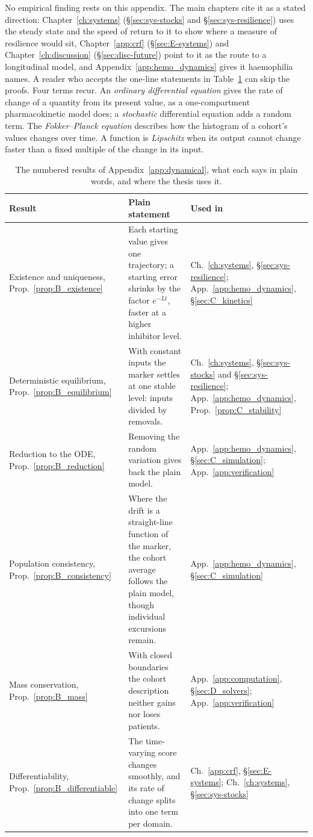 No empirical finding rests on this appendix. The main chapters cite it as a
stated direction: Chapter~\ref{ch:systems} (\S\ref{sec:sys-stocks} and
\S\ref{sec:sys-resilience}) uses the steady state and the speed of return to it
to show where a measure of resilience would sit, Chapter~\ref{app:crf}
(\S\ref{sec:E-systems}) and Chapter~\ref{ch:discussion}
(\S\ref{sec:disc-future}) point to it as the route to a longitudinal model, and
Appendix~\ref{app:hemo_dynamics} gives it haemophilia names. A reader who
accepts the one-line statements in Table~\ref{tab:B-results} can skip the
proofs. Four terms recur. An \emph{ordinary differential equation} gives the
rate of change of a quantity from its present value, as a one-compartment
pharmacokinetic model does; a \emph{stochastic} differential equation adds a
random term. The \emph{Fokker--Planck equation} describes how the histogram of
a cohort's values changes over time. A function is \emph{Lipschitz} when its
output cannot change faster than a fixed multiple of the change in its input.

\begin{table}[htbp]\centering
\footnotesize
\caption{The numbered results of Appendix~\ref{app:dynamical}, what each says in plain words, and where the thesis uses it.}
\label{tab:B-results}
\begin{tabular}{p{3.4cm}p{5.8cm}p{3.9cm}}
\toprule
Result & Plain statement & Used in \\
\midrule
Existence and uniqueness, Prop.~\ref{prop:B_existence} & Each starting value gives one trajectory; a starting error shrinks by the factor $e^{-Lt}$, faster at a higher inhibitor level. & Ch.~\ref{ch:systems}, \S\ref{sec:sys-resilience}; App.~\ref{app:hemo_dynamics}, \S\ref{sec:C_kinetics} \\
Deterministic equilibrium, Prop.~\ref{prop:B_equilibrium} & With constant inputs the marker settles at one stable level: inputs divided by removals. & Ch.~\ref{ch:systems}, \S\ref{sec:sys-stocks} and \S\ref{sec:sys-resilience}; App.~\ref{app:hemo_dynamics}, Prop.~\ref{prop:C_stability} \\
Reduction to the ODE, Prop.~\ref{prop:B_reduction} & Removing the random variation gives back the plain model. & App.~\ref{app:hemo_dynamics}, \S\ref{sec:C_simulation}; App.~\ref{app:verification} \\
Population consistency, Prop.~\ref{prop:B_consistency} & Where the drift is a straight-line function of the marker, the cohort average follows the plain model, though individual excursions remain. & App.~\ref{app:hemo_dynamics}, \S\ref{sec:C_simulation} \\
Mass conservation, Prop.~\ref{prop:B_mass} & With closed boundaries the cohort description neither gains nor loses patients. & App.~\ref{app:computation}, \S\ref{sec:D_solvers}; App.~\ref{app:verification} \\
Differentiability, Prop.~\ref{prop:B_differentiable} & The time-varying score changes smoothly, and its rate of change splits into one term per domain. & Ch.~\ref{app:crf}, \S\ref{sec:E-systems}; Ch.~\ref{ch:systems}, \S\ref{sec:sys-stocks} \\
\bottomrule
\end{tabular}
\end{table}


